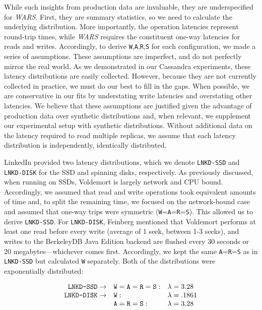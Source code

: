 \documentclass{vldb}
\begin{document}
While such insights from production data are invaluable, they are underspecified 
for \textit{WARS}.  First, they are summary statistics, so we need to
calculate the underlying distribution.  More importantly, the
operation latencies represent round-trip times, while \textit{WARS}
requires the constituent one-way latencies for reads and writes.
Accordingly, to derive \texttt{W},\texttt{A},\texttt{R},\texttt{S} for
each configuration, we made a series of assumptions.  These
assumptions are imperfect, and do not perfectly mirror the real world.
As we demonstrated in our Cassandra experiments, these latency
distributions are easily collected.  However, because they are not
currently collected in practice, we must do our best to fill in the
gaps.  When possible, we are conservative in our fits by understating
write latencies and overstating other latencies.  We believe that
these assumptions are justified given the advantage of production data
over synthetic distributions and, when relevant, we supplement our
experimental setup with synthetic distributions.  Without additional
data on the latency required to read multiple replicas, we assume that
each latency distribution is independently, identically distributed.

LinkedIn provided two latency distributions, which we denote
\texttt{LNKD-SSD} and \texttt{LNKD-DISK} for the SSD and spinning
disks, respectively.  As previously discussed, when running on SSDs,
Voldemort is largely network and CPU bound.  Accordingly, we assumed
that read and write operations took equivalent amounts of time and, to
split the remaining time, we focused on the network-bound case and
assumed that one-way trips were symmetric
(\texttt{W}=\texttt{A}=\texttt{R}=\texttt{S}).  This allowed us to
derive \texttt{LNKD-SSD}.  For \texttt{LNKD-DISK}, Feinberg mentioned
that Voldemort performs at least one read before every write (average
of 1 seek, between 1-3 seeks), and writes to the BerkeleyDB Java
Edition backend are flushed every 30 seconds or 20
megabytes---whichever comes first.  Accordingly, we kept the same
\texttt{A}=\texttt{R}=\texttt{S} as in \texttt{LNKD-SSD} but
calculated \texttt{W} separately.  Both of the
distributions were exponentially distributed:\vspace{-2mm}

\begin{equation*}
 \begin{array}{rll}
\texttt{LNKD-SSD} \rightarrow & \texttt{W} = \texttt{A}= \texttt{R} = \texttt{S}: & \lambda = 3.28\\
\texttt{LNKD-DISK} \rightarrow & \texttt{W}: & \lambda = .1861\\
&  \texttt{A} = \texttt{R} = \texttt{S}: & \lambda = 3.28$$\\
\end{array}
\end{equation*}
\end{document}
